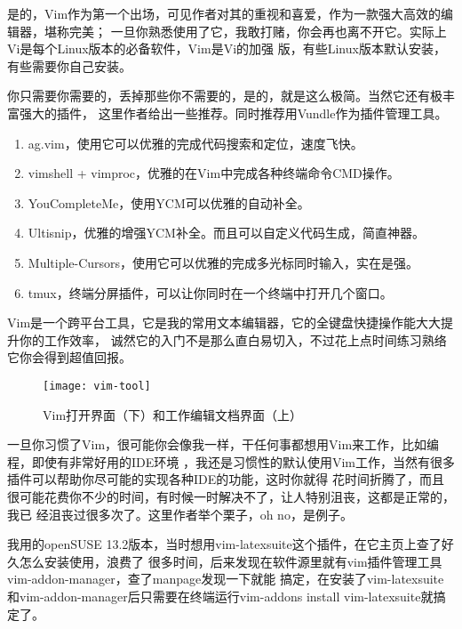 \documentclass[11pt,fleqn]{book} %
\begin{document}
是的，Vim作为第一个出场，可见作者对其的重视和喜爱，作为一款强大高效的编辑器，堪称完美；
一旦你熟悉使用了它，我敢打赌，你会再也离不开它。实际上Vi是每个Linux版本的必备软件，Vim是Vi的加强
版，有些Linux版本默认安装，有些需要你自己安装。

你只需要你需要的，丢掉那些你不需要的，是的，就是这么极简。当然它还有极丰富强大的插件，
这里作者给出一些推荐。同时推荐用Vundle作为插件管理工具。

\begin{enumerate}
  \item ag.vim，使用它可以优雅的完成代码搜索和定位，速度飞快。
  \item vimshell + vimproc，优雅的在Vim中完成各种终端命令CMD操作。
  \item YouCompleteMe，使用YCM可以优雅的自动补全。
  \item Ultisnip，优雅的增强YCM补全。而且可以自定义代码生成，简直神器。
  \item Multiple-Cursors，使用它可以优雅的完成多光标同时输入，实在是强。
  \item tmux，终端分屏插件，可以让你同时在一个终端中打开几个窗口。
\end{enumerate}

Vim是一个跨平台工具，它是我的常用文本编辑器，它的全键盘快捷操作能大大提升你的工作效率，
诚然它的入门不是那么直白易切入，不过花上点时间练习熟络它你会得到超值回报。
\begin{figure}[!th]
\noindent\texttt{[image: vim-tool]}
\caption{Vim打开界面（下）和工作编辑文档界面（上）}
\end{figure}
\begin{tips}
  一旦你习惯了Vim，很可能你会像我一样，干任何事都想用Vim来工作，比如编程，即使有非常好用的IDE环境
  ，我还是习惯性的默认使用Vim工作，当然有很多插件可以帮助你尽可能的实现各种IDE的功能，这时你就得
  花时间折腾了，而且很可能花费你不少的时间，有时候一时解决不了，让人特别沮丧，这都是正常的，我已
  经沮丧过很多次了。这里作者举个栗子，oh no，是例子\faOptinMonster。
\end{tips}
\begin{example}
  我用的openSUSE 13.2版本，当时想用vim-latexsuite这个插件，在它主页上查了好久怎么安装使用，浪费了
  很多时间，后来发现在软件源里就有vim插件管理工具vim-addon-manager，查了manpage发现一下就能
  搞定，在安装了vim-latexsuite和vim-addon-manager后只需要在终端运行vim-addons install 
  vim-latexsuite就搞定了。
\end{example}
\end{document}
